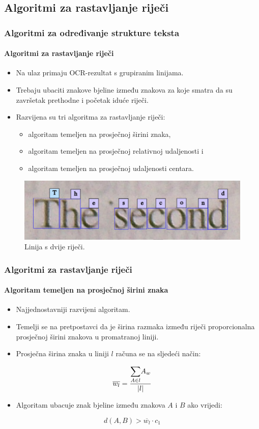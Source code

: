 \documentclass{beamer}
\begin{document}
\subsection{Algoritmi za rastavljanje riječi}
\begin{frame}
\frametitle{Algoritmi za određivanje strukture teksta}
\framesubtitle{Algoritmi za rastavljanje riječi}
\begin{itemize}
    \item Na ulaz primaju OCR-rezultat s grupiranim linijama.
    \item Trebaju ubaciti znakove bjeline između znakova za koje smatra
          da su završetak prethodne i početak iduće riječi.
    \item Razvijena su tri algoritma za rastavljanje riječi:
    \begin{itemize}
        \item algoritam temeljen na prosječnoj širini znaka,
        \item algoritam temeljen na prosječnoj relativnoj udaljenosti i
        \item algoritam temeljen na prosječnoj udaljenosti centara.
    \end{itemize}
\end{itemize}
\begin{figure}[htb]
    \centering
    \includegraphics[width=.8\textwidth]{images/book-example-02.png}
    \caption{Linija s dvije riječi.}
    \label{fig:book-example-02}
\end{figure}
\end{frame}
\begin{frame}
\frametitle{Algoritmi za rastavljanje riječi}
\framesubtitle{Algoritam temeljen na prosječnoj širini znaka}
\begin{itemize}
    \item Najjednostavniji razvijeni algoritam.
    \item Temelji se na pretpostavci da je širina razmaka između riječi
          proporcionalna prosječnoj širini znakova u promatranoj liniji.
    \item Prosječna širina znaka u liniji $l$ računa se na sljedeći način:
\end{itemize}
\begin{equation}
\overline{w_l} = \frac{\mathlarger{\sum}\limits_{A \in l} A_w}{|l|}
\end{equation}
\begin{itemize}
    \item Algoritam ubacuje znak bjeline između znakova $A$ i $B$ ako vrijedi:
\end{itemize}
\begin{equation}
\label{eq:condition-01}
d(A, B) > \overline{w_l} \cdot c_1
\end{equation}
\end{frame}
\end{document}
